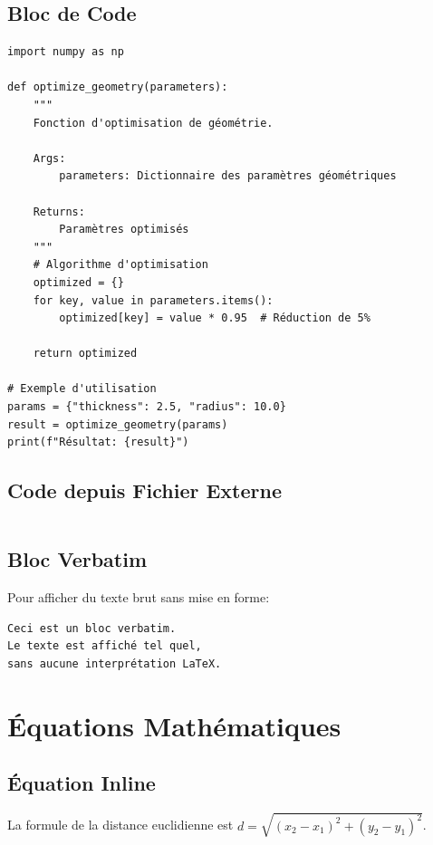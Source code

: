 \subsection{Bloc de Code}
\begin{listing}[!htpb]
\caption{Exemple de code Python pour l'optimisation.}
\label{listing:python-exemple}
\begin{verbatim}
import numpy as np

def optimize_geometry(parameters):
    """
    Fonction d'optimisation de géométrie.
    
    Args:
        parameters: Dictionnaire des paramètres géométriques
    
    Returns:
        Paramètres optimisés
    """
    # Algorithme d'optimisation
    optimized = {}
    for key, value in parameters.items():
        optimized[key] = value * 0.95  # Réduction de 5%
    
    return optimized

# Exemple d'utilisation
params = {"thickness": 2.5, "radius": 10.0}
result = optimize_geometry(params)
print(f"Résultat: {result}")
\end{verbatim}
\end{listing}

\subsection{Code depuis Fichier Externe}
\begin{listing}[!htpb]
\caption{Exemple de code Haskell importé depuis un fichier externe.}
\label{listing:haskell-exemple}
\inputminted{haskell}{Code/Factorial.hs}
\end{listing}

\subsection{Bloc Verbatim}
Pour afficher du texte brut sans mise en forme:

\begin{verbatim}
Ceci est un bloc verbatim.
Le texte est affiché tel quel,
sans aucune interprétation LaTeX.
\end{verbatim}

\section{Équations Mathématiques}

\subsection{Équation Inline}
La formule de la distance euclidienne est \(d = \sqrt{(x_2-x_1)^2 + (y_2-y_1)^2}\).


